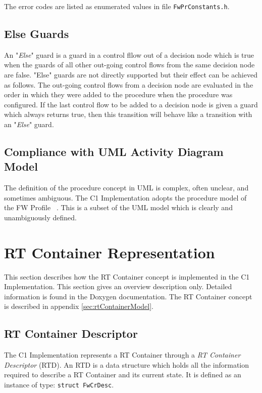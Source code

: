 \documentclass[a4paper,10pt]{article}
\let\stdsection\section
\renewcommand\section{\newpage\stdsection}
\begin{document}
The error codes are listed as enumerated values in file \texttt{FwPrConstants.h}.

\subsection{Else Guards}
An "\emph{Else}" guard is a guard in a control fllow out of a decision node which is true when the guards of 
all other out-going control flows from the same decision node are false. "Else" guards are not directly 
supported but their effect can be achieved as follows. The out-going control flows from a decision node
are evaluated in the order in which they were added to the procedure when the procedure was configured. 
If the last control flow to be added 
to a decision node is given a guard which always returns true, then this transition will behave like 
a transition with an "\emph{Else}" guard.

\subsection{Compliance with UML Activity Diagram Model}
The definition of the procedure concept in UML is complex, often unclear, and sometimes ambiguous. 
The C1 Implementation adopts the procedure model of the FW Profile ~\cite{ref:fwprofile}. 
This is a subset of the UML model which is clearly and unambiguously defined. 

\section{RT Container Representation}
This section describes how the RT Container concept is implemented in the C1 Implementation. This section gives an overview description only. Detailed information is found in the Doxygen documentation. The RT Container concept is described in appendix \ref{sec:rtContainerModel}.

\subsection{RT Container Descriptor}\label{sec:rtDesc}
The C1 Implementation represents a RT Container through a \emph{RT Container Descriptor} (RTD). An RTD is a data structure which holds all the information required to describe a RT Container and its current state. It is defined as an instance of type: \texttt{struct FwCrDesc}.
\end{document}

